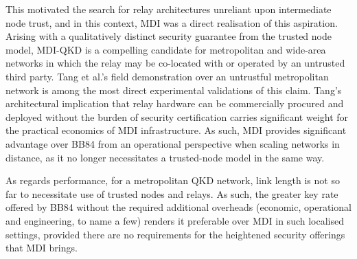 \documentclass[9pt,technote]{IEEEtran}
\begin{document}
This motivated the search for relay architectures unreliant upon intermediate node trust, and in this context, MDI was a direct realisation of this aspiration. Arising with a qualitatively distinct security guarantee from the trusted node model, MDI-QKD is a compelling candidate for metropolitan and wide-area networks in which the relay may be co-located with or operated by an untrusted third party. Tang et al.'s field demonstration \cite{Tang_2016} over an untrustful metropolitan network is among the most direct experimental validations of this claim. Tang's architectural implication that relay hardware can be commercially procured and deployed without the burden of security certification carries significant weight for the practical economics of MDI infrastructure. As such, MDI provides significant advantage over BB84 from an operational perspective when scaling networks in distance, as it no longer necessitates a trusted-node model in the same way.

As regards performance, for a metropolitan QKD network, link length is not so far to necessitate use of trusted nodes and relays. As such, the greater key rate offered by BB84 without the required additional overheads (economic, operational and engineering, to name a few) renders it preferable over MDI in such localised settings, provided there are no requirements for the heightened security offerings that MDI brings.
\end{document}
